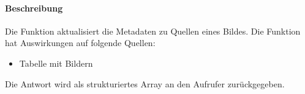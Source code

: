 \paragraph{Beschreibung} Die Funktion aktualisiert die Metadaten zu Quellen eines Bildes. Die Funktion hat Auswirkungen auf folgende Quellen:
\begin{itemize}
	\item Tabelle mit Bildern
\end{itemize}
Die Antwort wird als strukturiertes Array an den Aufrufer zurückgegeben.